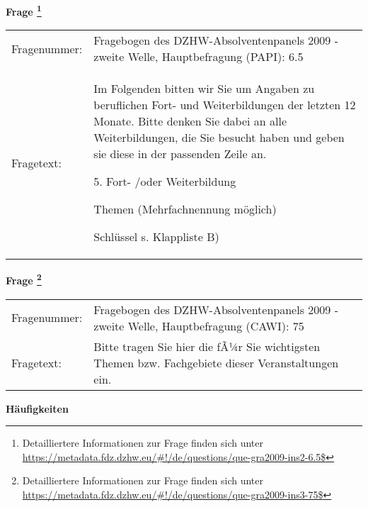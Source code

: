 				\vspace*{0.5cm}
                \noindent\textbf{Frage
	                \footnote{Detailliertere Informationen zur Frage finden sich unter
		              \url{https://metadata.fdz.dzhw.eu/\#!/de/questions/que-gra2009-ins2-6.5$}}}\\
				\begin{tabularx}{\hsize}{@{}lX}
					Fragenummer: &
					  Fragebogen des DZHW-Absolventenpanels 2009 - zweite Welle, Hauptbefragung (PAPI):
					  6.5
 \\
					Fragetext: & Im Folgenden bitten wir Sie um Angaben zu beruflichen Fort- und Weiterbildungen der letzten 12 Monate. Bitte denken Sie dabei an alle Weiterbildungen, die Sie besucht haben und geben sie diese in der passenden Zeile an.\par  5. Fort- /oder Weiterbildung\par  Themen (Mehrfachnennung möglich)\par  Schlüssel s. Klappliste B) \\
				\end{tabularx}
				\vspace*{0.5cm}
                \noindent\textbf{Frage
	                \footnote{Detailliertere Informationen zur Frage finden sich unter
		              \url{https://metadata.fdz.dzhw.eu/\#!/de/questions/que-gra2009-ins3-75$}}}\\
				\begin{tabularx}{\hsize}{@{}lX}
					Fragenummer: &
					  Fragebogen des DZHW-Absolventenpanels 2009 - zweite Welle, Hauptbefragung (CAWI):
					  75
 \\
					Fragetext: & Bitte tragen Sie hier die fÃ¼r Sie wichtigsten Themen bzw. Fachgebiete dieser Veranstaltungen ein. \\
				\end{tabularx}





        		\vspace*{0.5cm}
                \noindent\textbf{Häufigkeiten}

